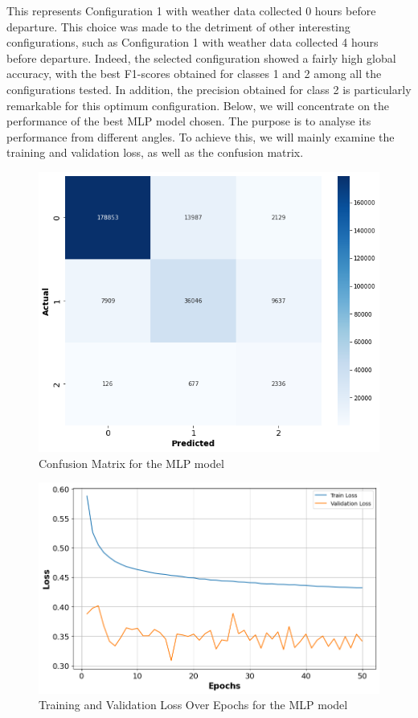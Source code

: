 \documentclass[12pt,oneside]{book} %
\begin{document}
\noindent This represents Configuration 1 with weather data collected 0 hours before departure. This choice was made to the detriment of other interesting configurations, such as Configuration 1 with weather data collected 4 hours before departure. Indeed, the selected configuration showed a fairly high global accuracy, with the best F1-scores obtained for classes 1 and 2 among all the configurations tested. In addition, the precision obtained for class 2 is particularly remarkable for this optimum configuration. Below, we will concentrate on the performance of the best MLP model chosen. The purpose is to analyse its performance from different angles. To achieve this, we will mainly examine the training and validation loss, as well as the confusion matrix.

\begin{figure}[H]
    \centering
    \includegraphics[width=0.75\linewidth]{Image/Confusionmatrix_MLP.png}
    \caption{\centering Confusion Matrix for the MLP model}
    \label{fig:Confusionmatrix_MLP}
\end{figure}

\begin{figure}[H]
    \centering
    \includegraphics[width=\linewidth]{Image/MLP_loss.png}
    \caption{\centering Training and Validation Loss Over Epochs for the MLP model}
    \label{fig:MLP_LOSS}
\end{figure}
\end{document}
